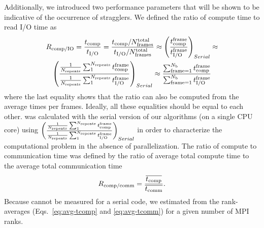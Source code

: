 Additionally, we introduced two performance parameters that will be shown to be indicative of the occurrence of stragglers.
We defined the ratio of compute time to read I/O time as
\begin{multline}
  \RcompIO = \frac{\tcomp}{\tIO} = %
  \frac{\tcomp/N_{\text{frames}}^{\text{total}}}{\tIO/N_{\text{frames}}^{\text{total}}} \approx \left (\frac{\tcomp^{\text{frame}}}{\tIO^{\text{frame}}}\right )_{Serial} \approx   \\
  \left (\frac{\frac{1}{N_{\text{repeats}}}\sum_{1}^{N_{\text{repeats}}}\tcomp^{\text{frame}}}{\frac{1}{N_{\text{repeats}}}\sum_{1}^{N_{\text{repeats}}}\tIO^{\text{frame}}}\right )_{Serial} \approx 
  \frac{\sum_{\text{frame}=1}^{N_{\text{b}}}\tcomp^{\text{frame}}}{\sum_{\text{frame}=1}^{N_{\text{b}}}\tIO^{\text{frame}}} 
  \label{eq:Compute-IO}
\end{multline}
where the last equality shows that the ratio can also be computed from the average times per frames.
Ideally, all these equalities should be equal to each other. 
\RcompIO was calculated with the serial version of our algorithms (on a single CPU core) using $\left (\frac{\frac{1}{N_{\text{repeats}}}\sum_{1}^{N_{\text{repeats}}}{t}_{\text{comp}}^{\text{frame}}}{\frac{1}{N_{\text{repeats}}}\sum_{1}^{N_{\text{repeats}}}{t}_{\text{I/O}}^{\text{frame}}}\right )_{Serial}$ in order to characterize the computational problem in the absence of parallelization.
The ratio of compute to communication time was defined by the ratio of average total compute time to the average total communication time   
\begin{equation}
  \label{eq:Compute-comm}
  R_{\text{comp/comm}} = \frac{\overline{{t}_{\text{comp}}}}{\overline{t_{\text{comm}}}}.
\end{equation}
Because \tcomm cannot be measured for a serial code, we estimated \Rcompcomm from the rank-averages (Eqs.~\ref{eq:avg-tcomp} and \ref{eq:avg-tcomm}) for a given number of MPI ranks.
